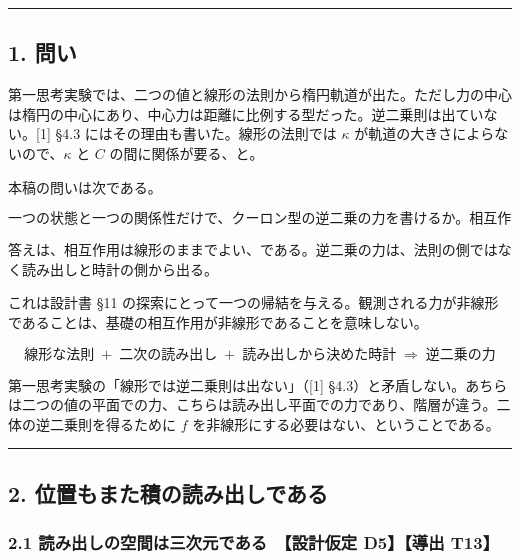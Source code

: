 \documentclass[
  a4paper,
]{ltjsarticle}
\begin{document}
\begin{center}\rule{0.5\linewidth}{0.5pt}\end{center}

\subsection{1. 問い}\label{ux554fux3044}

第一思考実験では、二つの値と線形の法則から楕円軌道が出た。ただし力の中心は楕円の中心にあり、中心力は距離に比例する型だった。逆二乗則は出ていない。{[}1{]}
§4.3 にはその理由も書いた。線形の法則では \(\kappa\)
が軌道の大きさによらないので、\(\kappa\) と \(C\) の間に関係が要る、と。

本稿の問いは次である。

\[
\boxed{\text{一つの状態と一つの関係性だけで、クーロン型の逆二乗の力を書けるか。相互作用は線形のままでよいか。}}
\]

答えは、相互作用は線形のままでよい、である。逆二乗の力は、法則の側ではなく読み出しと時計の側から出る。

これは設計書 §11
の探索にとって一つの帰結を与える。観測される力が非線形であることは、基礎の相互作用が非線形であることを意味しない。

\[
\boxed{\;\text{線形な法則}\;+\;\text{二次の読み出し}\;+\;\text{読み出しから決めた時計}\;\Longrightarrow\;\text{逆二乗の力}\;}
\]

第一思考実験の「線形では逆二乗則は出ない」（{[}1{]}
§4.3）と矛盾しない。あちらは二つの値の平面での力、こちらは読み出し平面での力であり、階層が違う。二体の逆二乗則を得るために
\(f\) を非線形にする必要はない、ということである。

\begin{center}\rule{0.5\linewidth}{0.5pt}\end{center}

\subsection{2.
位置もまた積の読み出しである}\label{ux4f4dux7f6eux3082ux307eux305fux7a4dux306eux8aadux307fux51faux3057ux3067ux3042ux308b}

\subsubsection{2.1 読み出しの空間は三次元である　【設計仮定 D5】【導出
T13】}\label{ux8aadux307fux51faux3057ux306eux7a7aux9593ux306fux4e09ux6b21ux5143ux3067ux3042ux308b-ux8a2dux8a08ux4eeeux5b9a-d5ux5c0eux51fa-t13}
\end{document}
